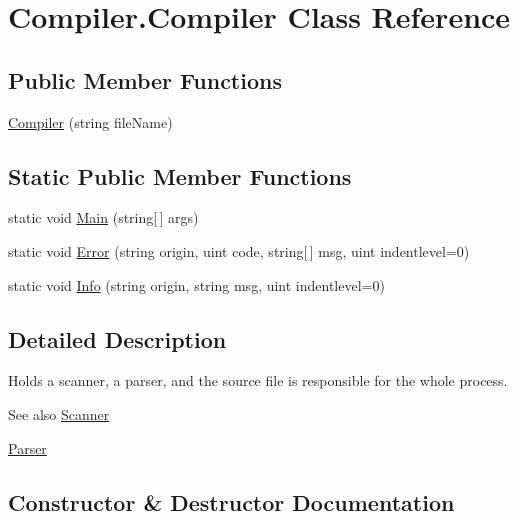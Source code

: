 \hypertarget{class_compiler_1_1_compiler}{}\section{Compiler.\+Compiler Class Reference}
\label{class_compiler_1_1_compiler}
\subsection*{Public Member Functions}
\begin{DoxyCompactItemize}
\item 
\mbox{\hyperlink{class_compiler_1_1_compiler_ab9ae50ccd497464301c3bd9acf5d1d89}{Compiler}} (string file\+Name)
\end{DoxyCompactItemize}
\subsection*{Static Public Member Functions}
\begin{DoxyCompactItemize}
\item 
static void \mbox{\hyperlink{class_compiler_1_1_compiler_aaa8629c1d8b60f4ad0e9771931b23471}{Main}} (string\mbox{[}$\,$\mbox{]} args)
\item 
static void \mbox{\hyperlink{class_compiler_1_1_compiler_ae76148be697c8ad3d4655dfc24fd7f1c}{Error}} (string origin, uint code, string\mbox{[}$\,$\mbox{]} msg, uint indentlevel=0)
\item 
static void \mbox{\hyperlink{class_compiler_1_1_compiler_a370b82209f5493e17a7f60c548fe2f80}{Info}} (string origin, string msg, uint indentlevel=0)
\end{DoxyCompactItemize}


\subsection{Detailed Description}
Holds a scanner, a parser, and the source file is responsible for the whole process. \begin{DoxySeeAlso}{See also}
\mbox{\hyperlink{class_compiler_1_1_scanner}{Scanner}} 

\mbox{\hyperlink{class_compiler_1_1_parser}{Parser}} 
\end{DoxySeeAlso}


\subsection{Constructor \& Destructor Documentation}
\mbox{\label{class_compiler_1_1_compiler_ab9ae50ccd497464301c3bd9acf5d1d89}} 
